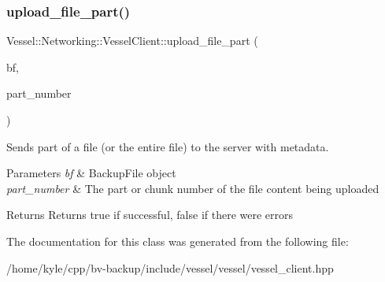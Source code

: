 \subsubsection{\texorpdfstring{upload\+\_\+file\+\_\+part()}{upload\_file\_part()}}
{\footnotesize\ttfamily Vessel\+::\+Networking\+::\+Vessel\+Client\+::upload\+\_\+file\+\_\+part (\begin{DoxyParamCaption}\item[{\hyperlink{class_vessel_1_1_file_1_1_backup_file}{Vessel\+::\+File\+::\+Backup\+File} $\ast$}]{bf,  }\item[{int}]{part\+\_\+number }\end{DoxyParamCaption})}



Sends part of a file (or the entire file) to the server with metadata. 


\begin{DoxyParams}{Parameters}
{\em bf} & Backup\+File object \\
\hline
{\em part\+\_\+number} & The part or chunk number of the file content being uploaded \\
\hline
\end{DoxyParams}
\begin{DoxyReturn}{Returns}
Returns true if successful, false if there were errors 
\end{DoxyReturn}


The documentation for this class was generated from the following file\+:\begin{DoxyCompactItemize}
\item 
/home/kyle/cpp/bv-\/backup/include/vessel/vessel/vessel\+\_\+client.\+hpp\end{DoxyCompactItemize}
